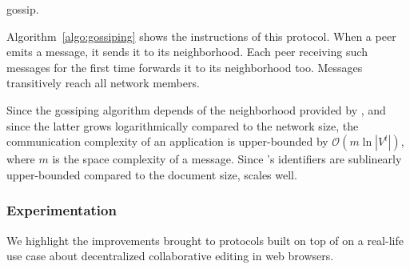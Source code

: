 \begin{algorithm}[h]
  
  \caption{\label{algo:gossiping}gossip.}
\end{algorithm}

Algorithm~\ref{algo:gossiping} shows the instructions of this protocol. When a
peer emits a message, it sends it to its neighborhood. Each peer receiving such
messages for the first time forwards it to its neighborhood too. Messages
transitively reach all network members.

Since the gossiping algorithm depends of the neighborhood provided by \SPRAY,
and since the latter grows logarithmically compared to the network size, the
communication complexity of an application is upper-bounded by
$\mathcal{O}(m \ln |V^t|)$, where $m$ is the space complexity of a
message. Since \CRATE's identifiers are sublinearly upper-bounded compared to
the document size, \CRATE scales well.


\subsubsection{Experimentation}
\label{subsec:experiments2}

We highlight the improvements brought to protocols built on top of \SPRAY on a
real-life use case about decentralized collaborative editing in web browsers.



